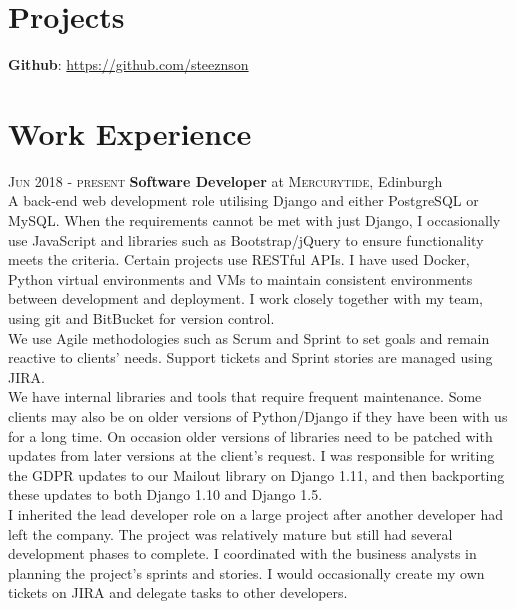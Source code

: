 \documentclass[14pt, a4paper]{extarticle}
\begin{document}
\begin{multicols}{2}
\section{Projects}
\noindent\textbf{Github}: \url{https://github.com/steeznson}

\columnbreak
\section{Work Experience}
\noindent\textsc{Jun 2018 - present} \textbf{Software Developer}
at \textsc{Mercurytide}, Edinburgh\\
A back-end web development role utilising Django and either PostgreSQL or MySQL. When the requirements cannot be met with just Django, I occasionally use JavaScript and libraries such as Bootstrap/jQuery to ensure functionality meets the criteria. Certain projects use RESTful APIs. I have used Docker, Python virtual environments and VMs to maintain consistent environments between development and deployment. I work closely together with my team, using git and BitBucket for version control.\\
We use Agile methodologies such as Scrum and Sprint to set goals and remain reactive to clients' needs. Support tickets and Sprint stories are managed using JIRA.\\
We have internal libraries and tools that require frequent maintenance. Some clients may also be on older versions of Python/Django if they have been with us for a long time. On occasion older versions of libraries need to be patched with updates from later versions at the client's request. I was responsible for writing the GDPR updates to our Mailout library on Django 1.11, and then backporting these updates to both Django 1.10 and Django 1.5.\\
I inherited the lead developer role on a large project after another developer had left the company. The project was relatively mature but still had several development phases to complete. I coordinated with the business analysts in planning the project's sprints and stories. I would occasionally create my own tickets on JIRA and delegate tasks to other developers.
\end{multicols}
\end{document}
